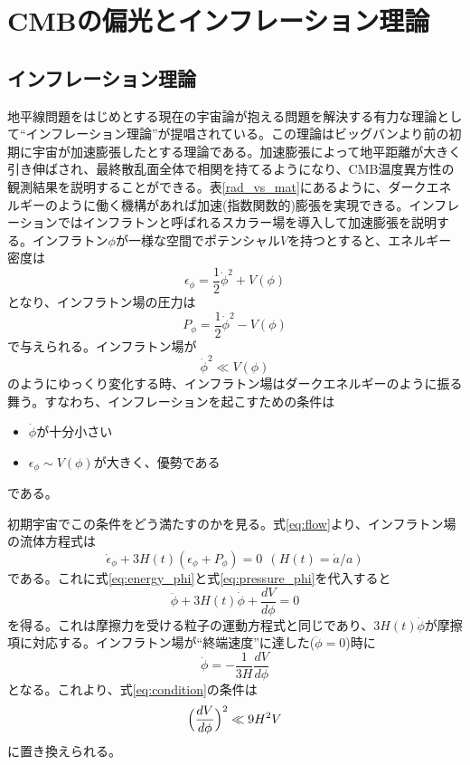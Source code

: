 \section{CMBの偏光とインフレーション理論}

\subsection{インフレーション理論}
地平線問題をはじめとする現在の宇宙論が抱える問題を解決する有力な理論として``インフレーション理論''が提唱されている。この理論はビッグバンより前の初期に宇宙が加速膨張したとする理論である。加速膨張によって地平距離が大きく引き伸ばされ、最終散乱面全体で相関を持てるようになり、CMB温度異方性の観測結果を説明することができる。表\ref{rad_vs_mat}にあるように、ダークエネルギーのように働く機構があれば加速(指数関数的)膨張を実現できる。インフレーションではインフラトンと呼ばれるスカラー場を導入して加速膨張を説明する。インフラトン$\phi$が一様な空間でポテンシャル$V$を持つとすると、エネルギー密度は
\begin{equation}
  \epsilon_{\phi} = \frac{1}{2}\dot\phi^{2} + V(\phi) \label{eq:energy_phi}
\end{equation}
となり、インフラトン場の圧力は
\begin{equation}
  P_{\phi} = \frac{1}{2}\dot\phi^{2} - V(\phi) \label{eq:pressure_phi}
\end{equation}
で与えられる。インフラトン場が
\begin{equation}
  \dot\phi^{2} \ll V(\phi) \label{eq:condition}
\end{equation}
のようにゆっくり変化する時、インフラトン場はダークエネルギーのように振る舞う。すなわち、インフレーションを起こすための条件は
\begin{itemize}
  \item $\dot\phi$が十分小さい
  \item $\epsilon_{\phi}\sim V(\phi)$が大きく、優勢である
\end{itemize}
である。

初期宇宙でこの条件をどう満たすのかを見る。式\eqref{eq:flow}より、インフラトン場の流体方程式は
\begin{equation}
  \dot\epsilon_{\phi} + 3H(t)(\epsilon_{\phi} + P_{\phi}) = 0  ~~ (H(t) = \dot{a}/a)
\end{equation}
である。これに式\eqref{eq:energy_phi}と式\eqref{eq:pressure_phi}を代入すると
\begin{equation}
  \ddot\phi + 3H(t)\dot\phi + \frac{dV}{d\phi} = 0
\end{equation}
を得る。これは摩擦力を受ける粒子の運動方程式と同じであり、$3H(t)\dot\phi$が摩擦項に対応する。インフラトン場が``終端速度''に達した($\ddot\phi = 0$)時に
\begin{equation}
  \dot\phi = -\frac{1}{3H}\frac{dV}{d\phi}
\end{equation}
となる。これより、式\eqref{eq:condition}の条件は
\begin{equation}
  \Bigl(\frac{dV}{d\phi}\Bigr)^{2} \ll 9H^{2}V
\end{equation}
に置き換えられる。


